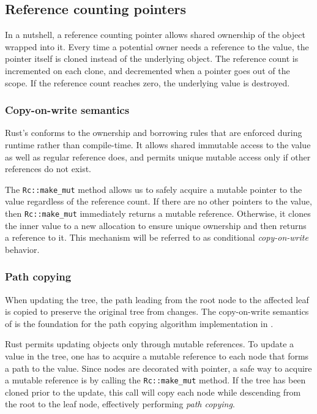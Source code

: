 \subsection{Reference counting pointers}
In a nutshell, a reference counting pointer allows shared ownership of the object wrapped into it. Every time a potential owner needs a reference to the value, the pointer itself is cloned instead of the underlying object. The reference count is incremented on each clone, and decremented when a pointer goes out of the scope. If the reference count reaches zero, the underlying value is destroyed.

\subsubsection*{Copy-on-write semantics}
Rust’s \rc{} conforms to the ownership and borrowing rules that are enforced during runtime rather than compile-time. It allows shared immutable access to the value as well as regular reference does, and permits unique mutable access only if other references do not exist.

The \texttt{Rc::make_mut} method allows us to safely acquire a mutable pointer to the value regardless of the reference count. If there are no other pointers to the value, then \texttt{Rc::make_mut} immediately returns a mutable reference. Otherwise, it clones the inner value to a new allocation to ensure unique ownership and then returns a reference to it. This mechanism will be referred to as conditional \emph{copy-on-write} behavior.

\subsubsection*{Path copying}
When updating the tree, the path leading from the root node to the affected leaf is copied to preserve the original tree from changes. The copy-on-write semantics of \rc{} is the foundation for the path copying algorithm implementation in \rrbtree{}.

Rust permits updating objects only through mutable references. To update a value in the tree, one has to acquire a mutable reference to each node that forms a path to the value. Since nodes are decorated with \rc{} pointer, a safe way to acquire a mutable reference is by calling the \texttt{Rc::make_mut} method. If the tree has been cloned prior to the update, this call will copy each node while descending from the root to the leaf node, effectively performing \emph{path copying}.


